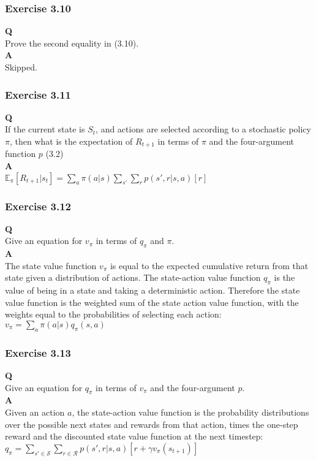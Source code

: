 \subsubsection{Exercise 3.10}
\textbf{Q}\\
Prove the second equality in (3.10). \\

\textbf{A}\\
Skipped.

\subsubsection{Exercise 3.11}
\textbf{Q}\\
If the current state is $S_t$, and actions are selected according to a stochastic policy \(\pi\), then what is the expectation of $R_{t+1}$ in terms of $\pi$ and the four-argument function \(p\) (3.2) \\

\textbf{A}\\
$
\mathbb{E}_\pi[R_{t+1} | s_t] = \sum_{a} \pi(a | s) \sum_{s'} \sum_{r} p(s', r | s, a) [r] 
$

\subsubsection{Exercise 3.12}
\textbf{Q}\\
Give an equation for $v_\pi$ in terms of $q_\pi$ and $\pi$. \\

\textbf{A}\\
The state value function \(v_\pi\) is equal to the expected cumulative return from that state given a distribution of actions. The state-action value function \(q_\pi\) is the value of being in a state and taking a deterministic action. Therefore the state value function is the weighted sum of the state action value function, with the weights equal to the probabilities of selecting each action:
$
v_\pi = \sum_{a} \pi(a | s) q_\pi(s,a) 
$

\subsubsection{Exercise 3.13}
\textbf{Q}\\
Give an equation for $q_\pi$ in terms of $v_\pi$ and the four-argument $p$.  \\

\textbf{A}\\
Given an action $a$, the state-action value function is the probability distributions over the possible next states and rewards from that action, times the one-step reward and the discounted state value function at the next timestep:
$
q_\pi = \sum_{s' \in \mathcal{S}} \sum_{r \in \mathcal{R}} p(s', r | s, a) [r + \gamma v_\pi(s_{t+1})]
$

